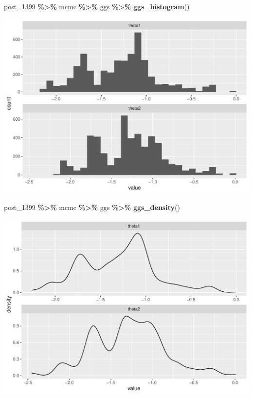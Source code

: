 \documentclass[
]{article}
\newenvironment{Shaded}{\begin{snugshade}}{\end{snugshade}}
\newcommand{\FunctionTok}[1]{\textcolor[rgb]{0.13,0.29,0.53}{\textbf{#1}}}
\newcommand{\NormalTok}[1]{#1}
\newcommand{\SpecialCharTok}[1]{\textcolor[rgb]{0.81,0.36,0.00}{\textbf{#1}}}
\begin{document}
\begin{Shaded}
\begin{Highlighting}[]
\NormalTok{post\_1399 }\SpecialCharTok{\%\textgreater{}\%}\NormalTok{ mcmc }\SpecialCharTok{\%\textgreater{}\%}\NormalTok{ ggs }\SpecialCharTok{\%\textgreater{}\%} \FunctionTok{ggs\_histogram}\NormalTok{()}
\end{Highlighting}
\end{Shaded}

\begin{center}\includegraphics[width=0.8\linewidth]{Bayes_stat_hw3_files/figure-latex/unnamed-chunk-20-1} \end{center}

\begin{Shaded}
\begin{Highlighting}[]
\NormalTok{post\_1399 }\SpecialCharTok{\%\textgreater{}\%}\NormalTok{ mcmc }\SpecialCharTok{\%\textgreater{}\%}\NormalTok{ ggs }\SpecialCharTok{\%\textgreater{}\%} \FunctionTok{ggs\_density}\NormalTok{()}
\end{Highlighting}
\end{Shaded}

\begin{center}\includegraphics[width=0.8\linewidth]{Bayes_stat_hw3_files/figure-latex/unnamed-chunk-20-2} \end{center}
\end{document}
